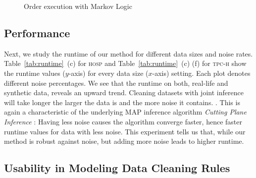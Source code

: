 \begin{figure}
\centering
{}
\caption{Order execution with Markov Logic} 
\label{fig:orderexec}
\end{figure}

\subsection{Performance}

Next, we study the runtime of our method for different data sizes and noise rates. Table~\ref{tab:runtime}~(c) for \textsc{hosp} and Table~\ref{tab:runtime}~(c) (f) for \textsc{tpc-h} show the runtime values ($y$-axis) for every data size ($x$-axis) setting. Each plot denotes different noise percentages. We see that the runtime on both, real-life and synthetic data, reveals an upward trend. Cleaning datasets with joint inference will take longer the larger the data is and the more noise it contains. . This is again a characteristic of the underlying MAP inference algorithm \textit{Cutting Plane Inference} \cite{riedel08improving}: Having less noise causes the algorithm converge faster, hence faster runtime values for data with less noise. This experiment tells us that, while our method is robust against noise, but adding more noise leads to higher runtime. 


\subsection{Usability in Modeling Data Cleaning Rules}

